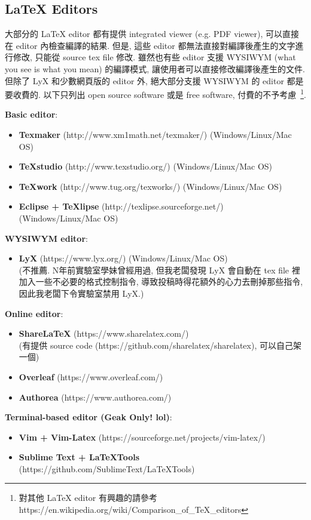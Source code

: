 \subsection{LaTeX Editors}

大部分的 LaTeX editor 都有提供 integrated viewer (e.g. PDF viewer), 可以直接在 editor 內檢查編譯的結果.
但是, 這些 editor 都無法直接對編譯後產生的文字進行修改, 只能從 source tex file 修改.
雖然也有些 editor 支援 WYSIWYM (what you see is what you mean) 的編譯模式, 讓使用者可以直接修改編譯後產生的文件.
但除了 LyX 和少數網頁版的 editor 外, 絕大部分支援 WYSIWYM 的 editor 都是要收費的.
以下只列出 open source software 或是 free software, 付費的不予考慮~\footnote{對其他 LaTeX editor 有興趣的請參考 https://en.wikipedia.org/wiki/Comparison\_of\_TeX\_editors}.


\textbf{Basic editor}:
\begin{itemize}
\item \textbf{Texmaker} (http://www.xm1math.net/texmaker/) (Windows/Linux/Mac OS)
\item \textbf{TeXstudio} (http://www.texstudio.org/) (Windows/Linux/Mac OS)
\item \textbf{TeXwork} (http://www.tug.org/texworks/) (Windows/Linux/Mac OS)
\item \textbf{Eclipse + TeXlipse} (http://texlipse.sourceforge.net/) (Windows/Linux/Mac OS)
\end{itemize}

\textbf{WYSIWYM editor}:
\begin{itemize}
\item \textbf{LyX} (https://www.lyx.org/) (Windows/Linux/Mac OS) \\
(不推薦. N年前實驗室學妹曾經用過, 但我老闆發現 LyX 會自動在 tex file 裡加入一些不必要的格式控制指令, 導致投稿時得花額外的心力去刪掉那些指令, 因此我老闆下令實驗室禁用 LyX.)
\end{itemize}


\textbf{Online editor}:
\begin{itemize}
\item \textbf{ShareLaTeX} (https://www.sharelatex.com/) \\
(有提供 source code (https://github.com/sharelatex/sharelatex), 可以自己架一個)
\item \textbf{Overleaf} (https://www.overleaf.com/)
\item \textbf{Authorea} (https://www.authorea.com/)
\end{itemize}

\textbf{Terminal-based editor (Geak Only! lol)}:
\begin{itemize}
\item \textbf{Vim + Vim-Latex} (https://sourceforge.net/projects/vim-latex/)
\item \textbf{Sublime Text + LaTeXTools} (https://github.com/SublimeText/LaTeXTools)
\end{itemize}